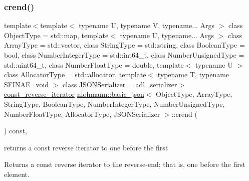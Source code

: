 \mbox{\label{classnlohmann_1_1basic__json_a5795b029dbf28e0cb2c7a439ec5d0a88}} 
\subsubsection{\texorpdfstring{crend()}{crend()}}
{\footnotesize\ttfamily template$<$template$<$ typename U, typename V, typename... Args $>$ class Object\+Type = std\+::map, template$<$ typename U, typename... Args $>$ class Array\+Type = std\+::vector, class String\+Type  = std\+::string, class Boolean\+Type  = bool, class Number\+Integer\+Type  = std\+::int64\+\_\+t, class Number\+Unsigned\+Type  = std\+::uint64\+\_\+t, class Number\+Float\+Type  = double, template$<$ typename U $>$ class Allocator\+Type = std\+::allocator, template$<$ typename T, typename S\+F\+I\+N\+A\+E=void $>$ class J\+S\+O\+N\+Serializer = adl\+\_\+serializer$>$ \\
\mbox{\hyperlink{classnlohmann_1_1basic__json_a72be3c24bfa24f0993d6c11af03e7404}{const\+\_\+reverse\+\_\+iterator}} \mbox{\hyperlink{classnlohmann_1_1basic__json}{nlohmann\+::basic\+\_\+json}}$<$ Object\+Type, Array\+Type, String\+Type, Boolean\+Type, Number\+Integer\+Type, Number\+Unsigned\+Type, Number\+Float\+Type, Allocator\+Type, J\+S\+O\+N\+Serializer $>$\+::crend (\begin{DoxyParamCaption}{ }\end{DoxyParamCaption}) const\hspace{0.3cm}{\ttfamily [inline]}, {\ttfamily [noexcept]}}



returns a const reverse iterator to one before the first 

Returns a const reverse iterator to the reverse-\/end; that is, one before the first element.

